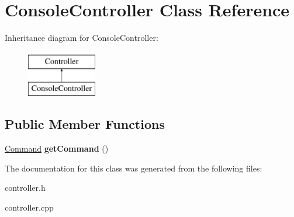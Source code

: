 \hypertarget{class_console_controller}{}\section{Console\+Controller Class Reference}
\label{class_console_controller}
Inheritance diagram for Console\+Controller\+:\begin{figure}[H]
\begin{center}
\leavevmode
\includegraphics[height=2.000000cm]{class_console_controller}
\end{center}
\end{figure}
\subsection*{Public Member Functions}
\begin{DoxyCompactItemize}
\item 
\mbox{\label{class_console_controller_a43ba6c4a33ed626692eaea2d534fe370}} 
\hyperlink{struct_command}{Command} {\bfseries get\+Command} ()
\end{DoxyCompactItemize}


The documentation for this class was generated from the following files\+:\begin{DoxyCompactItemize}
\item 
controller.\+h\item 
controller.\+cpp\end{DoxyCompactItemize}

